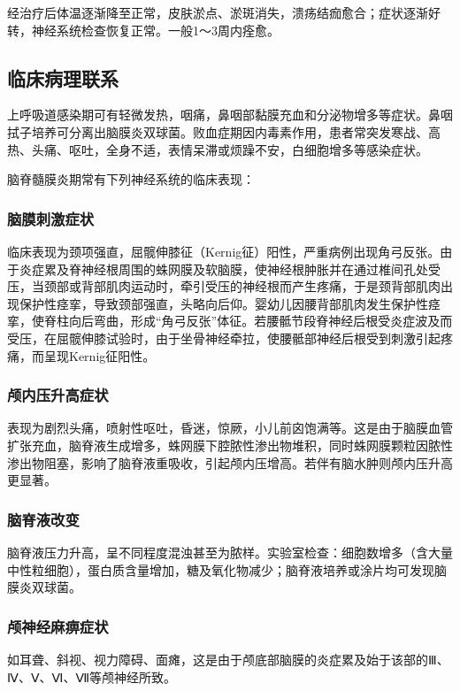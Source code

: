 经治疗后体温逐渐降至正常，皮肤淤点、淤斑消失，溃疡结痂愈合；症状逐渐好转，神经系统检查恢复正常。一般1～3周内痊愈。

\subsection{临床病理联系}

上呼吸道感染期可有轻微发热，咽痛，鼻咽部黏膜充血和分泌物增多等症状。鼻咽拭子培养可分离出脑膜炎双球菌。败血症期因内毒素作用，患者常突发寒战、高热、头痛、呕吐，全身不适，表情呆滞或烦躁不安，白细胞增多等感染症状。

脑脊髓膜炎期常有下列神经系统的临床表现：

\subsubsection{脑膜刺激症状}

临床表现为颈项强直，屈髋伸膝征（Kernig征）阳性，严重病例出现角弓反张。由于炎症累及脊神经根周围的蛛网膜及软脑膜，使神经根肿胀并在通过椎间孔处受压，当颈部或背部肌肉运动时，牵引受压的神经根而产生疼痛，于是颈背部肌肉出现保护性痉挛，导致颈部强直，头略向后仰。婴幼儿因腰背部肌肉发生保护性痉挛，使脊柱向后弯曲，形成“角弓反张”体征。若腰骶节段脊神经后根受炎症波及而受压，在屈髋伸膝试验时，由于坐骨神经牵拉，使腰骶部神经后根受到刺激引起疼痛，而呈现Kernig征阳性。

\subsubsection{颅内压升高症状}

表现为剧烈头痛，喷射性呕吐，昏迷，惊厥，小儿前囟饱满等。这是由于脑膜血管扩张充血，脑脊液生成增多，蛛网膜下腔脓性渗出物堆积，同时蛛网膜颗粒因脓性渗出物阻塞，影响了脑脊液重吸收，引起颅内压增高。若伴有脑水肿则颅内压升高更显著。

\subsubsection{脑脊液改变}

脑脊液压力升高，呈不同程度混浊甚至为脓样。实验室检查：细胞数增多（含大量中性粒细胞），蛋白质含量增加，糖及氧化物减少；脑脊液培养或涂片均可发现脑膜炎双球菌。

\subsubsection{颅神经麻痹症状}

如耳聋、斜视、视力障碍、面瘫，这是由于颅底部脑膜的炎症累及始于该部的Ⅲ、Ⅳ、Ⅴ、Ⅵ、Ⅶ等颅神经所致。

